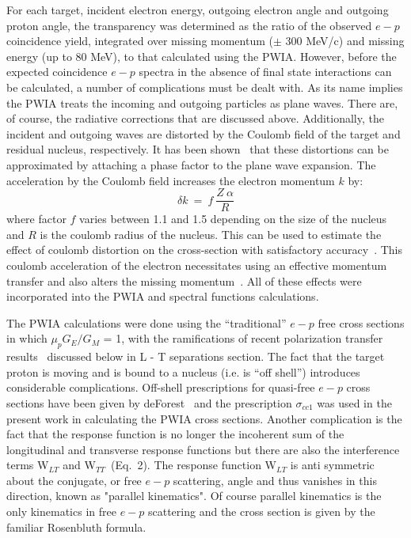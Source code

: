 \documentclass[aps,prl,twocolumn,showpacs,amsmath,amssymb,floats]{revtex4}
\begin{document}
For each target, incident electron energy, outgoing electron angle and outgoing 
proton angle, the transparency was determined as the ratio of the observed $e-p$ 
coincidence yield, integrated over missing momentum ($\pm$ 300 MeV/c) and missing 
energy (up to 80 MeV), to that calculated using the PWIA.     However, before 
the expected coincidence $e-p$ spectra in the absence of final state interactions 
can be calculated, a number of complications must be dealt with.  As its name 
implies the PWIA treats the incoming and outgoing particles as plane waves.  
There are, of course, the radiative corrections that are discussed above.  
Additionally, the incident and outgoing waves are distorted by the Coulomb field 
of the target and residual nucleus, respectively.  It has been 
shown~\cite{hor81} that these distortions can be approximated by attaching a 
phase factor to the plane wave expansion.  The acceleration by the Coulomb field 
increases the electron momentum $k$ by:
\begin{equation}
\delta k~=~f~\frac{Z~\alpha}{R}
\end{equation}  
where factor $f$ varies between 1.1 and 1.5 depending on the size of the nucleus 
and $R$ is the coulomb radius of the nucleus. This can be used to estimate the
effect of coulomb distortion on the cross-section with satisfactory 
accuracy~\cite{knoll74}.  This coulomb acceleration of the electron 
necessitates using an effective momentum 
transfer and also alters the missing momentum~\cite{ent02}.  All of these 
effects were incorporated into the PWIA and spectral functions calculations.

The PWIA calculations were done using the ``traditional'' $e-p$ free cross 
sections in which $\mu_{p}G_E/G_M$ = 1, with the ramifications of recent polarization transfer results~\cite{mjones00} discussed below in L - T separations section.  The fact that the target proton is moving and 
is bound to a nucleus (i.e. is ``off shell'') introduces considerable 
complications. Off-shell prescriptions for quasi-free $e-p$ cross sections have 
been given by deForest~\cite{defor83} and the prescription $\sigma_{cc1}$ was 
used in the present work in calculating the PWIA cross sections.  Another 
complication is the fact that the response function is no longer the incoherent 
sum of the longitudinal and transverse response functions but there are also the 
interference terms W$_{LT}$ and W$_{TT}$~(Eq.~2).  The response function 
W$_{LT}$ is anti symmetric about the conjugate, or free $e-p$ scattering, angle 
and thus vanishes in this direction, 
known as "parallel kinematics".  Of course parallel kinematics is the only 
kinematics in free $e-p$ scattering and the cross section is given by the familiar 
Rosenbluth formula. 
\end{document}
